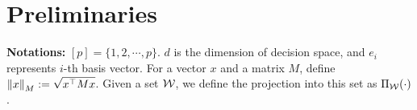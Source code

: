 \section{Preliminaries}\label{sec:prel}
{\bf Notations:} $[p] = \{1,2,\cdots, p\}$. $d$ is the dimension of decision space, and $e_i$ represents $i$-th basis vector. For a vector $x$ and a matrix $M$, define $\left\|{x}\right\|_M:=\sqrt{x^\top Mx}$. Given a set $\mathcal{W}$, we define the projection into this set as $\Pi_{\mathcal{W}}(\cdot)$. 


